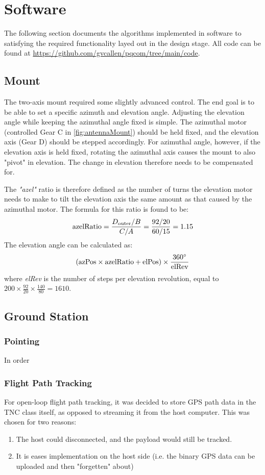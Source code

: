 \section{Software}

The following section documents the algorithms implemented in software to satisfying the required functionality layed out in the design stage. All code can be found at \url{https://github.com/gvcallen/pqcom/tree/main/code}.

\subsection{Mount}
The two-axis mount required some slightly advanced control. The end goal is to be able to set a specific azimuth and elevation angle. Adjusting the elevation angle while keeping the azimuthal angle fixed is simple. The azimuthal motor (controlled Gear C in \ref{fig:antennaMount}) should be held fixed, and the elevation axis (Gear D) should be stepped accordingly. For azimuthal angle, however, if the elevation axis is held fixed, rotating the azimuthal axis causes the mount to also "pivot" in elevation. The change in elevation therefore needs to be compensated for.

The \textit{"azel"} ratio is therefore defined as the number of turns the elevation motor needs to make to tilt the elevation axis the same amount as that caused by the azimuthal motor. The formula for this ratio is found to be:
$$
\textnormal{azelRatio} = \frac{D_{\textnormal{outer}} / B}{C / A} = \frac{92 / 20}{60 / 15} = 1.15
$$
\noindent The elevation angle can be calculated as:
$$
(\textnormal{azPos} \times \textnormal{azelRatio} + \textnormal{elPos}) \times \frac{360 ^{\circ}}{\textnormal{elRev}}
$$
where \textit{elRev} is the number of steps per elevation revolution, equal to $200 \times \frac{92}{20} \times \frac{140}{80} = 1610$.

\subsection{Ground Station}

\subsubsection{Pointing}
In order 

\subsubsection{Flight Path Tracking}
For open-loop flight path tracking, it was decided to store GPS path data in the TNC class itself, as opposed to streaming it from the host computer. This was chosen for two reasons:
\begin{enumerate}
  \item The host could disconnected, and the payload would still be tracked.
  \item It is eases implementation on the host side (i.e. the binary GPS data can be uploaded and then "forgetten" about)
\end{enumerate}

